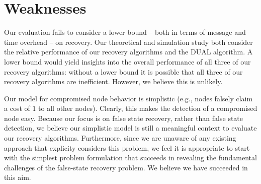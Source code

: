 \section{Weaknesses}
\label{sec:weak}

Our evaluation fails to consider a lower bound -- both in terms of message and time overhead -- on recovery.   Our theoretical and simulation study both consider the relative 
performance of our recovery algorithms and the DUAL algorithm.  A lower bound would yield insights into the overall performance of all three of our recovery algorithms: without a lower
bound it is possible that all three of our recovery algorithms are inefficient.  However, we believe this is unlikely.

Our model for compromised node behavior is simplistic (e.g., nodes falsely claim a cost of $1$ to all other nodes).  Clearly, this makes the detection of a compromised node easy.  Because
our focus is on false state recovery, rather than false state detection, we believe our simplistic model is still a meaningful context to evaluate our recovery algorithms. 
Furthermore, since we are unaware of any existing approach that explicity considers this problem, we feel it is appropriate to start with the simplest problem formulation that succeeds in revealing 
the fundamental challenges of the false-state recovery problem.  We believe we have succeeded in this aim. 

